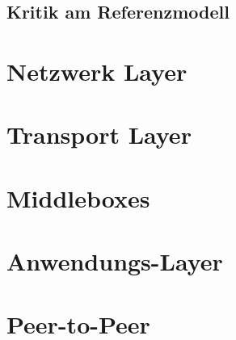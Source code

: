 \documentclass[paper=a4, fontsize=11pt]{scrartcl}
\numberwithin{equation}{section}
\numberwithin{figure}{section}
\numberwithin{table}{section}
\begin{document}
\subsection{Kritik am Referenzmodell}

\newpage

\section{Netzwerk Layer}

\newpage

\section{Transport Layer}

\newpage

\section{Middleboxes}

\newpage

\section{Anwendungs-Layer}

\newpage

\section{Peer-to-Peer}
\end{document}
